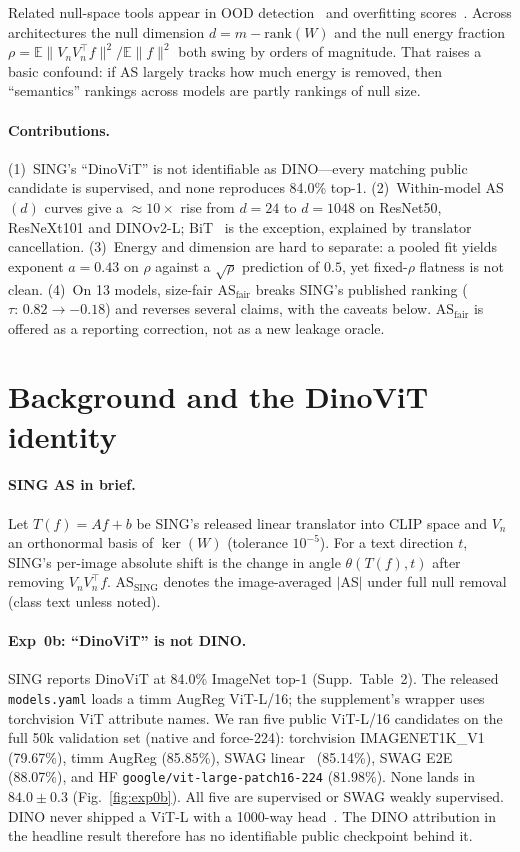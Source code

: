 \documentclass[10pt,twocolumn]{article}
\begin{document}
Related null-space tools appear in OOD detection~\citep{vim2022,cook2020} and overfitting scores~\citep{rezaei2023}.
Across architectures the null dimension $d{=}m{-}\mathrm{rank}(W)$ and the null energy fraction
$\rho = \mathbb{E}\|V_nV_n^\top f\|^2/\mathbb{E}\|f\|^2$
both swing by orders of magnitude.
That raises a basic confound: if AS largely tracks how much energy is removed, then ``semantics'' rankings across models are partly rankings of null size.

\paragraph{Contributions.}
(1)~SING's ``DinoViT'' is not identifiable as DINO---every matching public candidate is supervised, and none reproduces 84.0\% top-1.
(2)~Within-model AS$(d)$ curves give a $\approx\!10\times$ rise from $d{=}24$ to $d{=}1048$ on ResNet50, ResNeXt101 and DINOv2-L; BiT~\citep{bit2020} is the exception, explained by translator cancellation.
(3)~Energy and dimension are hard to separate: a pooled fit yields exponent $a{=}0.43$ on $\rho$ against a $\sqrt{\rho}$ prediction of $0.5$, yet fixed-$\rho$ flatness is not clean.
(4)~On 13 models, size-fair $\mathrm{AS}_{\mathrm{fair}}$ breaks SING's published ranking ($\tau{:}\,0.82\to{-}0.18$) and reverses several claims, with the caveats below.
$\mathrm{AS}_{\mathrm{fair}}$ is offered as a reporting correction, not as a new leakage oracle.

\section{Background and the DinoViT identity}
\vspace{-0.2em}
\paragraph{SING AS in brief.}
Let $T(f)=Af+b$ be SING's released linear translator into CLIP space and $V_n$ an orthonormal basis of $\ker(W)$ (tolerance $10^{-5}$).
For a text direction $t$, SING's per-image absolute shift is the change in angle $\theta(T(f),t)$ after removing $V_nV_n^\top f$.
$\mathrm{AS}_{\mathrm{SING}}$ denotes the image-averaged $|$AS$|$ under full null removal (class text unless noted).

\paragraph{Exp~0b: ``DinoViT'' is not DINO.}
SING reports DinoViT at 84.0\% ImageNet top-1 (Supp.\ Table~2).
The released \texttt{models.yaml} loads a timm AugReg ViT-L/16; the supplement's wrapper uses torchvision ViT attribute names.
We ran five public ViT-L/16 candidates on the full 50k validation set (native and force-224):
torchvision IMAGENET1K\_V1 (79.67\%),
timm AugReg (85.85\%),
SWAG linear~\citep{swag2022} (85.14\%),
SWAG E2E (88.07\%),
and HF \texttt{google/vit-large-patch16-224} (81.98\%).
None lands in $84.0\pm0.3$ (Fig.~\ref{fig:exp0b}).
All five are supervised or SWAG weakly supervised. DINO never shipped a ViT-L with a 1000-way head~\citep{dino2021}.
The DINO attribution in the headline result therefore has no identifiable public checkpoint behind it.
\end{document}
